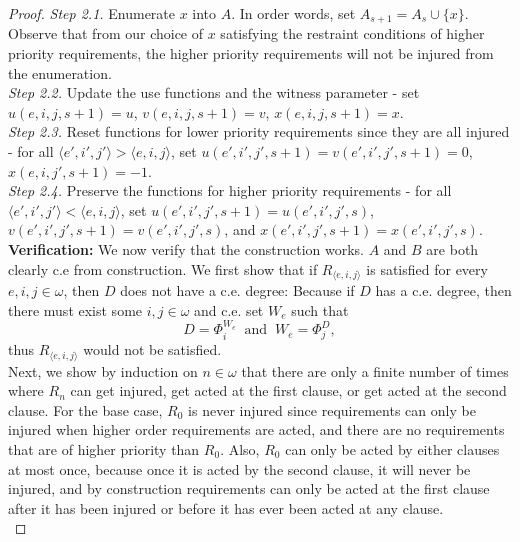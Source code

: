 \documentclass{article}
\begin{document}
\begin{proof}
    \textit{Step 2.1.} Enumerate $x$ into $A$. In order words, set
    $A_{s+1}=A_s\cup\{x\}$. Observe that from our choice of $x$
    satisfying the restraint conditions of higher priority
    requirements, the higher priority requirements will not be injured
    from the enumeration. \\

    \textit{Step 2.2.} Update the use functions and the witness parameter -
    set $u(e,i,j,s+1)=u$, $v(e,i,j,s+1)=v$, $x(e,i,j,s+1)=x$. \\

    \textit{Step 2.3.} Reset functions for lower priority requirements
    since they are all injured - for all $\langle e',i',j'\rangle >\langle
    e,i,j\rangle$, set $u(e',i',j',s+1)=v(e',i',j',s+1)=0$,
    $x(e,i,j',s+1)=-1$. \\

    \textit{Step 2.4.} Preserve the functions for higher
    priority requirements - for all $\langle e',i',j'\rangle <\langle
    e,i,j\rangle$, set $u(e',i',j',s+1)=u(e',i',j',s)$,
    $v(e',i',j',s+1)=v(e',i',j',s)$, and $x(e',i',j',s+1)=x(e',i',j',s)$.
    \\

    \textbf{Verification:} We now verify that the construction works.
    $A$ and $B$ are both clearly c.e from construction. We first show that
    if $R_{\langle e,i,j\rangle}$ is satisfied for every $e,i,j\in\omega$,
    then $D$ does not have a c.e. degree: Because if $D$ has a c.e. degree,
    then there must exist some $i,j\in\omega$ and c.e. set $W_e$ such that
    \[D=\Phi_i^{W_e}\;\; \text{and}\;\; W_e=\Phi_j^D,\]
    thus $R_{\langle e,i,j\rangle}$ would not be satisfied. \\

    Next, we show by induction on $n\in\omega$ that there are only a finite
    number of times where $R_n$ can get injured, get acted at the first
    clause, or get acted at the second clause. For the base case, $R_0$ is
    never injured since requirements can only be injured when higher order
    requirements are acted, and there are no requirements that are of
    higher priority than $R_0$. Also, $R_0$ can only be acted by either
    clauses at most once, because once it is acted by the second clause, it
    will never be injured, and by construction requirements can only be
    acted at the first clause after it has been injured or before it has
    ever been acted at any clause. \\


\end{proof}
\end{document}
